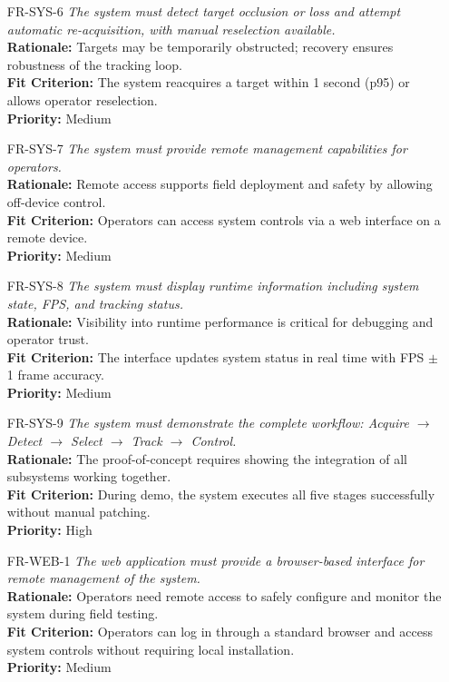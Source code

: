 \documentclass[12pt]{article}
\begin{document}
\begin{itemize}
  \item[FR-SYS-6] \emph{The system must detect target occlusion or loss and attempt automatic re-acquisition, with manual reselection available.}\\[2mm]
    {\bf Rationale:} Targets may be temporarily obstructed; recovery ensures robustness of the tracking loop.\\
    {\bf Fit Criterion:} The system reacquires a target within 1 second (p95) or allows operator reselection.\\
    {\bf Priority:} Medium

  \item[FR-SYS-7] \emph{The system must provide remote management capabilities for operators.}\\[2mm]
    {\bf Rationale:} Remote access supports field deployment and safety by allowing off-device control.\\
    {\bf Fit Criterion:} Operators can access system controls via a web interface on a remote device.\\
    {\bf Priority:} Medium

  \item[FR-SYS-8] \emph{The system must display runtime information including system state, FPS, and tracking status.}\\[2mm]
    {\bf Rationale:} Visibility into runtime performance is critical for debugging and operator trust.\\
    {\bf Fit Criterion:} The interface updates system status in real time with FPS $\pm$ 1 frame accuracy.\\
    {\bf Priority:} Medium

  \item[FR-SYS-9] \emph{The system must demonstrate the complete workflow: Acquire $\rightarrow$ Detect $\rightarrow$ Select $\rightarrow$ Track $\rightarrow$ Control.}\\[2mm]
    {\bf Rationale:} The proof-of-concept requires showing the integration of all subsystems working together.\\
    {\bf Fit Criterion:} During demo, the system executes all five stages successfully without manual patching.\\
    {\bf Priority:} High

\item[FR-WEB-1] \emph{The web application must provide a browser-based interface for remote management of the system.}\\[2mm]
  {\bf Rationale:} Operators need remote access to safely configure and monitor the system during field testing.\\
  {\bf Fit Criterion:} Operators can log in through a standard browser and access system controls without requiring local installation.\\
  {\bf Priority:} Medium


\end{itemize}
\end{document}
